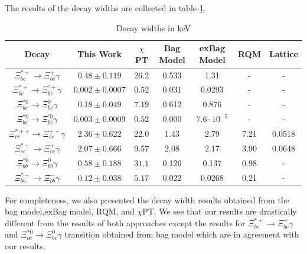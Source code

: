The results of the decay widths are collected in table-\ref{decays_table}.
\begin{table}[ht]
    \centering
    \begin{tabular}{|c|c|c|c|c|c|c|}
        \hline
         Decay & This Work & $\chi$ PT\cite{transition15} & Bag Model\cite{transition10} & exBag Model\cite{exBag} & RQM\cite{RQM} & Lattice\cite{lattice}  \\
         \hline
         $\Xi_{bc}^{\ast+}\rightarrow\Xi_{bc}^{+}\gamma$& $0.48\pm0.119$ & $26.2$ & 0.533 & 1.31 & - & -\\
         \hline
         $\Xi_{bc}^{\ast+}\rightarrow\Xi_{bc}^{\prime+}\gamma$& $0.002\pm0.0007$ & $0.52$ & 0.031 & 0.0293 & - & -\\
         \hline
         $\Xi_{bc}^{\ast0}\rightarrow\Xi_{bc}^{0}\gamma$& $0.18\pm0.049$ & $7.19$ &  0.612 & 0.876 & - & -\\
         \hline
         $\Xi_{bc}^{\ast0}\rightarrow\Xi_{bc}^{\prime0}\gamma$& $0.003\pm0.0009$ & $0.52$  & 0.000 & $7.6 \cdot 10^{-5}$ & - & -\\
         \hline
          $\Xi_{cc}^{\ast++}\rightarrow\Xi_{cc}^{++}\gamma$& $2.36\pm0.622$ & 22.0 & 1.43 & 2.79 & 7.21 & 0.0518\\
         \hline
         $\Xi_{cc}^{\ast+}\rightarrow\Xi_{cc}^{+}\gamma$& $2.07\pm0.666$ & 9.57 & 2.08 & 2.17 & 3.90 & 0.0648\\
         \hline
         $\Xi_{bb}^{\ast0}\rightarrow\Xi_{bb}^{0}\gamma$& $0.58\pm0.188$ & $31.1$ & 0.126 & 0.137 & 0.98 & -\\
         \hline
         $\Xi_{bb}^{\ast-}\rightarrow\Xi_{bb}^{-}\gamma$& $0.12\pm0.038$ & $5.17$ & 0.022 & 0.0268 & 0.21 & -\\
        \hline
    \end{tabular}
    \caption{Decay widths in keV}
    \label{decays_table}
\end{table}

For completeness, we also presented the decay width results obtained from the bag model,exBag model, RQM, and $\chi$PT. We see that our results are drastically different from the results of both approaches except the results for $\Xi_{bc}^{\ast+}\longrightarrow\Xi_{bc}^+\gamma$ and $\Xi_{bc}^{\ast0}\longrightarrow\Xi_{bc}^0\gamma$ transition obtained from bag model which are in agreement with our results. 

